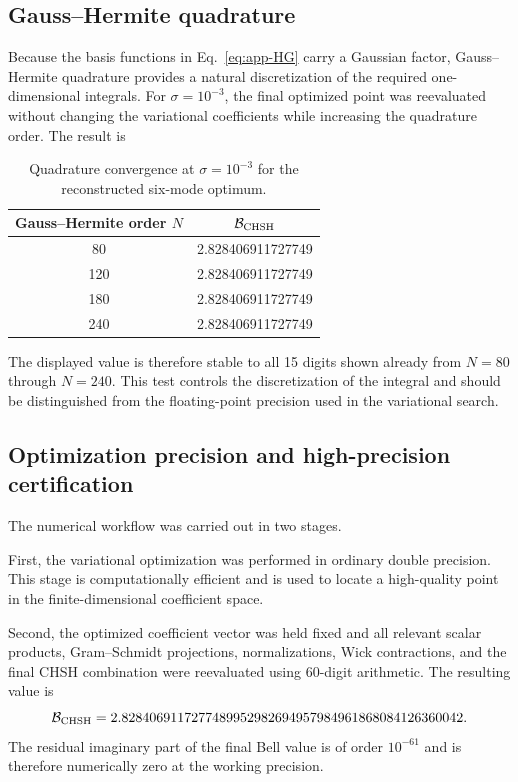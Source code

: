 \documentclass[11pt]{article}
\begin{document}
\subsection{Gauss--Hermite quadrature}

Because the basis functions in Eq.~\eqref{eq:app-HG} carry a Gaussian factor,
Gauss--Hermite quadrature provides a natural discretization of the required
one-dimensional integrals. For $\sigma=10^{-3}$, the final optimized point was
reevaluated without changing the variational coefficients while increasing the
quadrature order. The result is
\begin{table}[h]
\centering
\begin{tabular}{cc}
\hline\hline
Gauss--Hermite order $N$ & $\mathcal B_{\rm CHSH}$ \\
\hline
80  & 2.828406911727749 \\
120 & 2.828406911727749 \\
180 & 2.828406911727749 \\
240 & 2.828406911727749 \\
\hline\hline
\end{tabular}
\caption{Quadrature convergence at $\sigma=10^{-3}$ for the reconstructed
six-mode optimum.}
\label{tab:app-quadrature}
\end{table}
The displayed value is therefore stable to all 15 digits shown already from
$N=80$ through $N=240$. This test controls the discretization of the integral
and should be distinguished from the floating-point precision used in the
variational search.

\subsection{Optimization precision and high-precision certification}

The numerical workflow was carried out in two stages.

First, the variational optimization was performed in ordinary double precision.
This stage is computationally efficient and is used to locate a high-quality
point in the finite-dimensional coefficient space.

Second, the optimized coefficient vector was held fixed and all relevant scalar
products, Gram--Schmidt projections, normalizations, Wick contractions, and the
final CHSH combination were reevaluated using 60-digit arithmetic. The resulting
value is
\begin{equation}
\mathcal B_{\rm CHSH}
=
2.8284069117277489952982694957984961868084126360042 .
\label{eq:app-highprecision}
\end{equation}
The residual imaginary part of the final Bell value is of order $10^{-61}$ and
is therefore numerically zero at the working precision.
\end{document}
